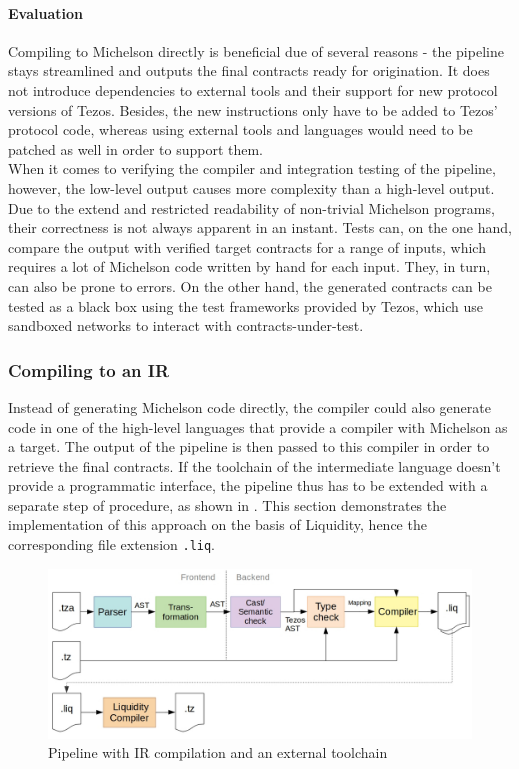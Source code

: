 \paragraph{Evaluation}
Compiling to Michelson directly is beneficial due of several reasons - the pipeline stays streamlined and outputs the final contracts ready for origination. It does not introduce dependencies to external tools and their support for new protocol versions of Tezos. Besides, the new instructions only have to be added to Tezos' protocol code, whereas using external tools and languages would need to be patched as well in order to support them. \\
When it comes to verifying the compiler and integration testing of the pipeline, however, the low-level output causes more complexity than a high-level output. Due to the extend and restricted readability of non-trivial Michelson programs, their correctness is not always apparent in an instant. Tests can, on the one hand, compare the output with verified target contracts for a range of inputs, which requires a lot of Michelson code written by hand for each input. They, in turn, can also be prone to errors. On the other hand, the generated contracts can be tested as a black box using the test frameworks provided by Tezos, which use sandboxed networks to interact with contracts-under-test.

\subsubsection{Compiling to an IR}\label{sec:IR}
Instead of generating Michelson code directly, the compiler could also generate code in one of the high-level languages that provide a compiler with Michelson as a target. The output of the pipeline is then passed to this compiler in order to retrieve the final contracts. If the toolchain of the intermediate language doesn't provide a programmatic interface, the pipeline thus has to be extended with a separate step of procedure, as shown in . This section demonstrates the implementation of this approach on the basis of Liquidity, hence the corresponding file extension \texttt{.liq}.
\begin{figure}[h]
\centering
\includegraphics[width=\linewidth]{figures/4-offline_tezos/pipeline_liq}
\caption{Pipeline with IR compilation and an external toolchain}
\label{fig:pipeline_liq}
\end{figure}


